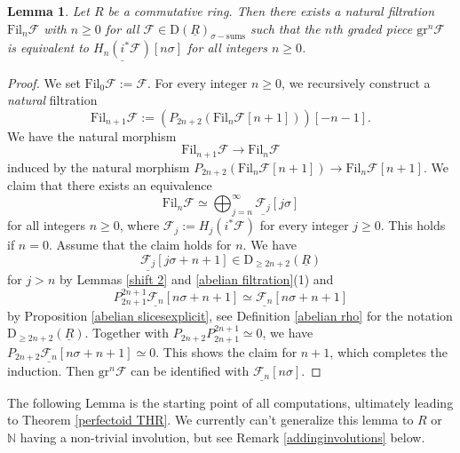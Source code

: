 \documentclass[10pt]{amsart}
\newtheorem{lem}[thm]{Lemma}
\theoremstyle{definition}
\numberwithin{equation}{section}
\newcommand{\N}{\mathbb{N}}
\newcommand{\cF}{\mathcal{F}}
\newcommand{\rD}{\mathrm{D}}
\newcommand{\ul}{\underline}
\newcommand{\gr}{\mathrm{gr}}
\newcommand{\Fil}{\mathrm{Fil}}
\begin{document}
\begin{lem}
\label{sigma filtration}
Let $R$ be a commutative ring.
Then there exists a natural filtration $\Fil_n \cF$ with $n\geq 0$ for all $\cF\in  \rD(\ul{R})_{\sigma-\mathrm{sums}}$ such that the $n$th graded piece $\gr^n \cF$ is equivalent to $\ul{H_n(i^*\cF)}[n\sigma]$ for all integers $n\geq 0$.
\end{lem}
\begin{proof}
We set $\Fil_0\cF:=\cF$.
For every integer $n\geq 0$,
we recursively construct a \emph{natural} filtration
\[
\Fil_{n+1} \cF
:=
(P_{2n+2}(\Fil_n \cF[n+1]))[-n-1].
\]
We have the natural morphism
\[
\Fil_{n+1}\cF
\to
\Fil_n\cF
\]
induced by the natural morphism $P_{2n+2}(\Fil_n \cF[n+1])\to \Fil_n \cF[n+1]$.
We claim that there exists an equivalence
\[
\Fil_n \cF
\simeq
\bigoplus_{j=n}^\infty \ul{\cF_j}[j\sigma]
\]
for all integers $n\geq 0$,
where $\cF_j:=H_j(i^*\cF)$ for every integer $j\geq 0$.
This holds if $n=0$.
Assume that the claim holds for $n$.
We have
\[
\ul{\cF_j}[j\sigma+n+1]\in \rD_{\geq 2n+2}(\ul{R})
\]
for $j>n$ by Lemmas \ref{shift 2} and \ref{abelian filtration}(1) and
\[
P_{2n+1}^{2n+1} \ul{\cF_n}[n\sigma + n+1]
\simeq
\ul{\cF_n}[n\sigma + n+1]
\]
by Proposition \ref{abelian slicesexplicit},
see Definition \ref{abelian rho} for the notation $\rD_{\geq 2n+2}(\ul{R})$.
Together with $P_{2n+2}P_{2n+1}^{2n+1}\simeq 0$, we have $P_{2n+2}\ul{\cF_n}[n\sigma+n+1]\simeq 0$.
This shows the claim for $n+1$,
which completes the induction.
Then $\gr^n \cF$ can be identified with $\ul{\cF_n}[n\sigma]$.
\end{proof}





The following Lemma is the starting point of all computations, ultimately leading to Theorem \ref{perfectoid THR}. We currently can't generalize this lemma to $R$ or $\N$ having a non-trivial involution, but see Remark \ref{addinginvolutions} below.
\end{document}
